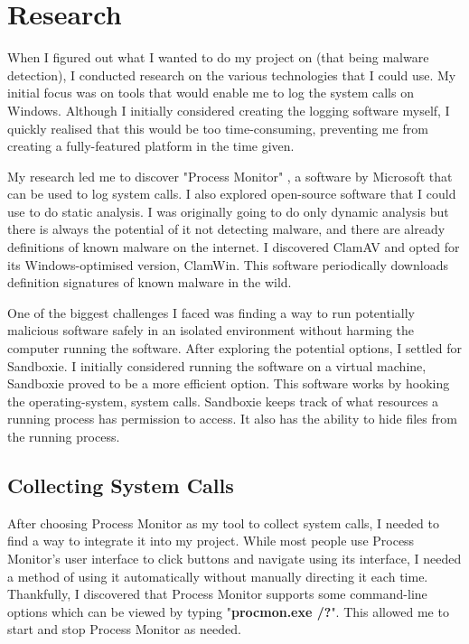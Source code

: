 \section{Research}
When I figured out what I wanted to do my project on
(that being malware detection),
I conducted research on the various technologies that I could use.
My initial focus was on tools that would enable me
to log the system calls on Windows.
Although I initially considered creating the logging software myself,
I quickly realised that this would be too time-consuming,
preventing me from creating a fully-featured platform in the time given.

My research led me to discover "Process Monitor" \cite{procmon},
a software by Microsoft that can be used to log system calls.
I also explored open-source software that
I could use to do static analysis.
I was originally going to do only dynamic analysis
but there is always the potential of it not detecting malware,
and there are already definitions of known malware on the internet.
I discovered ClamAV and opted for its Windows-optimised version, ClamWin.
This software periodically downloads definition signatures
of known malware in the wild.

One of the biggest challenges I faced was finding a way to
run potentially malicious software safely
in an isolated environment without harming the
computer running the software.
After exploring the potential options,
I settled for Sandboxie. \cite{sandboxie}
I initially considered running the software on a virtual machine,
Sandboxie proved to be a more efficient option.
This software works by hooking the operating-system, system calls.
Sandboxie keeps track of what resources a running
process has permission to access.
It also has the ability to hide files from the running process.

\subsection{Collecting System Calls}
After choosing Process Monitor as my tool to collect system calls,
I needed to find a way to integrate it into my project.
While most people use Process Monitor's user interface
to click buttons and navigate using its interface,
I needed a method of using it automatically
without manually directing it each time.
Thankfully, I discovered that Process Monitor supports some command-line
options which can be viewed by typing "\textbf{procmon.exe /?}".
This allowed me to start and stop Process Monitor as needed.

